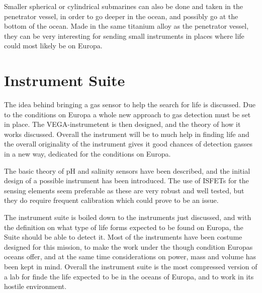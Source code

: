 Smaller spherical or cylindrical submarines can also be done and taken in the penetrator vessel, in order to go deeper in the ocean, and possibly go at the bottom of the ocean. Made in the same titanium alloy as the penetrator vessel, they can be very interesting for sending small instruments in places where life could most likely be on Europa.

\section{Instrument Suite}
The idea behind bringing a gas sensor to help the search for life is discussed. Due to the conditions on Europa a whole new approach to gas detection must be set in place. The VEGA-instrumetent is then designed, and the theory of how it works discussed. Overall the instrument will be to much help in finding life and the overall originality of the instrument gives it good chances of detection gasses in a new way, dedicated for the conditions on Europa.

The basic theory of pH and salinity sensors have been described, and the initial design of a possible instrument has been introduced. The use of ISFETs for the sensing elements seem preferable as these are very robust and well tested, but they do require frequent calibration which could prove to be an issue. 

The instrument suite is boiled down to the instruments just discussed, and with the definition on what type of life forms expected to be found on Europa, the Suite should be able to detect it. Most of the instruments have been costume designed for this mission, to make the work under the though condition Europas oceans offer, and at the same time considerations on power, mass and volume has been kept in mind. Overall the instrument suite is the most compressed version of a lab for finde the life expected to be in the oceans of Europa, and to work in its hostile environment.
